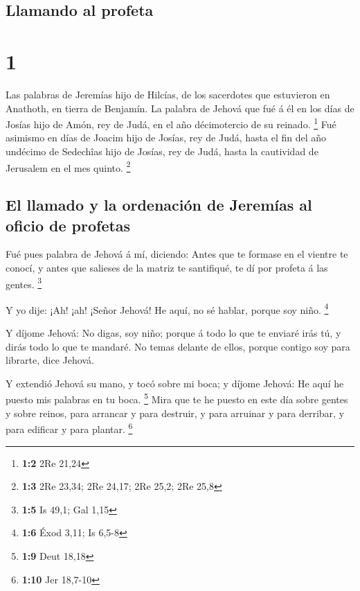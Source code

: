 \hypertarget{llamando-al-profeta}{%
\subsection{Llamando al profeta}\label{llamando-al-profeta}}

\hypertarget{section}{%
\section{1}\label{section}}

 Las palabras de Jeremías hijo de Hilcías, de los
sacerdotes que estuvieron en Anathoth, en tierra de Benjamín.
 La palabra de Jehová que fué á él en los días de Josías
hijo de Amón, rey de Judá, en el año décimotercio de su reinado.
\footnote{\textbf{1:2} 2Re 21,24}  Fué asimismo en días de
Joacim hijo de Josías, rey de Judá, hasta el fin del año undécimo de
Sedechîas hijo de Josías, rey de Judá, hasta la cautividad de Jerusalem
en el mes quinto. \footnote{\textbf{1:3} 2Re 23,34; 2Re 24,17; 2Re 25,2;
  2Re 25,8}

\hypertarget{el-llamado-y-la-ordenaciuxf3n-de-jeremuxedas-al-oficio-de-profetas}{%
\subsection{El llamado y la ordenación de Jeremías al oficio de
profetas}\label{el-llamado-y-la-ordenaciuxf3n-de-jeremuxedas-al-oficio-de-profetas}}

 Fué pues palabra de Jehová á mí, diciendo: 
Antes que te formase en el vientre te conocí, y antes que salieses de la
matriz te santifiqué, te dí por profeta á las gentes. \footnote{\textbf{1:5}
  Is 49,1; Gal 1,15}

 Y yo dije: ¡Ah! ¡ah! ¡Señor Jehová! He aquí, no sé
hablar, porque soy niño. \footnote{\textbf{1:6} Éxod 3,11; Is 6,5-8}

 Y díjome Jehová: No digas, soy niño; porque á todo lo que
te enviaré irás tú, y dirás todo lo que te mandaré.  No
temas delante de ellos, porque contigo soy para librarte, dice Jehová.

 Y extendió Jehová su mano, y tocó sobre mi boca; y díjome
Jehová: He aquí he puesto mis palabras en tu boca. \footnote{\textbf{1:9}
  Deut 18,18}  Mira que te he puesto en este día sobre
gentes y sobre reinos, para arrancar y para destruir, y para arruinar y
para derribar, y para edificar y para plantar. \footnote{\textbf{1:10}
  Jer 18,7-10}

